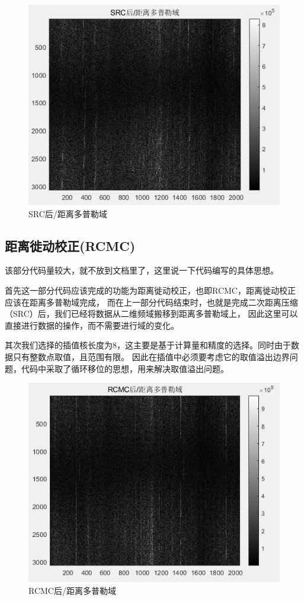 \documentclass{article}
\begin{document}
\begin{figure}[H] %
	\centering
	\includegraphics[scale=1]{6.png}
	\caption{SRC后/距离多普勒域}
	\label{6}
\end{figure}




\subsection{距离徙动校正(RCMC)}
该部分代码量较大，就不放到文档里了，这里说一下代码编写的具体思想。

首先这一部分代码应该完成的功能为距离徙动校正，也即RCMC，距离徙动校正应该在距离多普勒域完成，
而在上一部分代码结束时，也就是完成二次距离压缩（SRC）后，我们已经将数据从二维频域搬移到距离多普勒域上，
因此这里可以直接进行数据的操作，而不需要进行域的变化。

其次我们选择的插值核长度为8，这主要是基于计算量和精度的选择。同时由于数据只有整数点取值，且范围有限。
因此在插值中必须要考虑它的取值溢出边界问题，代码中采取了循环移位的思想，用来解决取值溢出问题。

\begin{figure}[H] %
	\centering
	\includegraphics[scale=1]{7.png}
	\caption{RCMC后/距离多普勒域}
	\label{7}
\end{figure}
\end{document}
